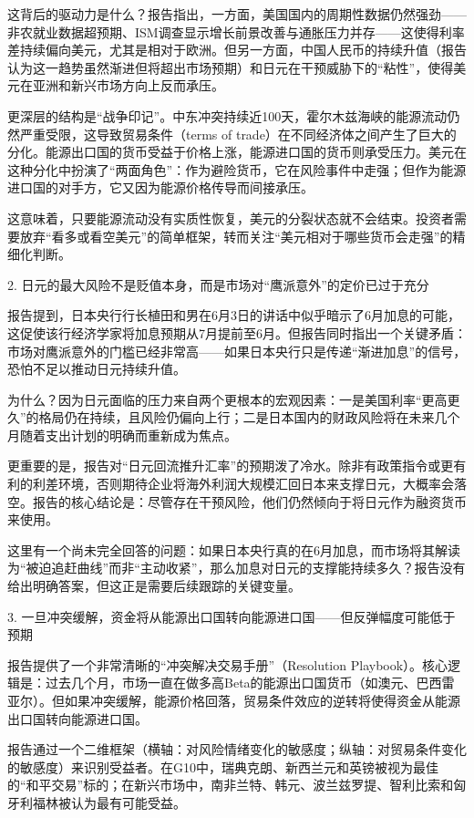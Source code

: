 \documentclass[11pt]{ctexart}
\begin{document}
这背后的驱动力是什么？报告指出，一方面，美国国内的周期性数据仍然强劲——非农就业数据超预期、ISM调查显示增长前景改善与通胀压力并存——这使得利率差持续偏向美元，尤其是相对于欧洲。但另一方面，中国人民币的持续升值（报告认为这一趋势虽然渐进但将超出市场预期）和日元在干预威胁下的“粘性”，使得美元在亚洲和新兴市场方向上反而承压。

更深层的结构是“战争印记”。中东冲突持续近100天，霍尔木兹海峡的能源流动仍然严重受限，这导致贸易条件（terms of trade）在不同经济体之间产生了巨大的分化。能源出口国的货币受益于价格上涨，能源进口国的货币则承受压力。美元在这种分化中扮演了“两面角色”：作为避险货币，它在风险事件中走强；但作为能源进口国的对手方，它又因为能源价格传导而间接承压。

这意味着，只要能源流动没有实质性恢复，美元的分裂状态就不会结束。投资者需要放弃“看多或看空美元”的简单框架，转而关注“美元相对于哪些货币会走强”的精细化判断。

2. 日元的最大风险不是贬值本身，而是市场对“鹰派意外”的定价已过于充分

报告提到，日本央行行长植田和男在6月3日的讲话中似乎暗示了6月加息的可能，这促使该行经济学家将加息预期从7月提前至6月。但报告同时指出一个关键矛盾：市场对鹰派意外的门槛已经非常高——如果日本央行只是传递“渐进加息”的信号，恐怕不足以推动日元持续升值。

为什么？因为日元面临的压力来自两个更根本的宏观因素：一是美国利率“更高更久”的格局仍在持续，且风险仍偏向上行；二是日本国内的财政风险将在未来几个月随着支出计划的明确而重新成为焦点。

更重要的是，报告对“日元回流推升汇率”的预期泼了冷水。除非有政策指令或更有利的利差环境，否则期待企业将海外利润大规模汇回日本来支撑日元，大概率会落空。报告的核心结论是：尽管存在干预风险，他们仍然倾向于将日元作为融资货币来使用。

这里有一个尚未完全回答的问题：如果日本央行真的在6月加息，而市场将其解读为“被迫追赶曲线”而非“主动收紧”，那么加息对日元的支撑能持续多久？报告没有给出明确答案，但这正是需要后续跟踪的关键变量。

3. 一旦冲突缓解，资金将从能源出口国转向能源进口国——但反弹幅度可能低于预期

报告提供了一个非常清晰的“冲突解决交易手册”（Resolution Playbook）。核心逻辑是：过去几个月，市场一直在做多高Beta的能源出口国货币（如澳元、巴西雷亚尔）。但如果冲突缓解，能源价格回落，贸易条件效应的逆转将使得资金从能源出口国转向能源进口国。

报告通过一个二维框架（横轴：对风险情绪变化的敏感度；纵轴：对贸易条件变化的敏感度）来识别受益者。在G10中，瑞典克朗、新西兰元和英镑被视为最佳的“和平交易”标的；在新兴市场中，南非兰特、韩元、波兰兹罗提、智利比索和匈牙利福林被认为最有可能受益。
\end{document}
